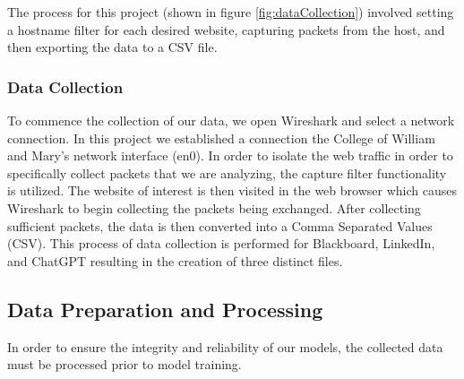 \documentclass[10pt,sigconf,letterpaper,nonacm]{acmart}
\begin{document}
 The process for this project (shown in figure \ref{fig:dataCollection}) involved setting a hostname filter for each desired website, capturing packets from the host, and then exporting the data to a CSV file.

 \subsubsection{Data Collection}
To commence the collection of our data, we open Wireshark and select a network connection. 
In this project we established a connection the College of William and Mary's network interface (en0). In order to isolate the web traffic in order to specifically collect 
packets that we are analyzing, the capture filter functionality is utilized. The website of interest is then visited in the web browser which causes Wireshark to begin collecting the packets being exchanged.
After collecting sufficient packets, the data is then converted into a Comma Separated Values (CSV). This process of data collection is performed for Blackboard, LinkedIn, and ChatGPT resulting in the creation of 
three distinct files. 

\subsection{Data Preparation and Processing}
In order to ensure the integrity and reliability of our models,
the collected data must be processed prior to model training.
\end{document}
